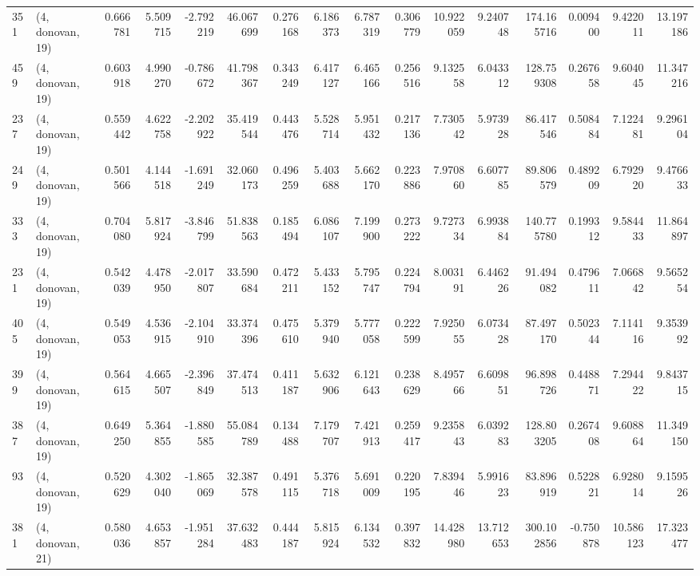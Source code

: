 \begin{tabular}{llrrrrrrrrrrrrrr}
351 &  (4, donovan, 19) &   0.666781 &   5.509715 &  -2.792219 &    46.067699 &   0.276168 &   6.186373 &   6.787319 &  0.306779 &  10.922059 &   9.240748 &   174.165716 &   0.009400 &   9.422011 &  13.197186 \\
459 &  (4, donovan, 19) &   0.603918 &   4.990270 &  -0.786672 &    41.798367 &   0.343249 &   6.417127 &   6.465166 &  0.256516 &   9.132558 &   6.043312 &   128.759308 &   0.267658 &   9.604045 &  11.347216 \\
237 &  (4, donovan, 19) &   0.559442 &   4.622758 &  -2.202922 &    35.419544 &   0.443476 &   5.528714 &   5.951432 &  0.217136 &   7.730542 &   5.973928 &    86.417546 &   0.508484 &   7.122481 &   9.296104 \\
249 &  (4, donovan, 19) &   0.501566 &   4.144518 &  -1.691249 &    32.060173 &   0.496259 &   5.403688 &   5.662170 &  0.223886 &   7.970860 &   6.607785 &    89.806579 &   0.489209 &   6.792920 &   9.476633 \\
333 &  (4, donovan, 19) &   0.704080 &   5.817924 &  -3.846799 &    51.838563 &   0.185494 &   6.086107 &   7.199900 &  0.273222 &   9.727334 &   6.993884 &   140.775780 &   0.199312 &   9.584433 &  11.864897 \\
231 &  (4, donovan, 19) &   0.542039 &   4.478950 &  -2.017807 &    33.590684 &   0.472211 &   5.433152 &   5.795747 &  0.224794 &   8.003191 &   6.446226 &    91.494082 &   0.479611 &   7.066842 &   9.565254 \\
405 &  (4, donovan, 19) &   0.549053 &   4.536915 &  -2.104910 &    33.374396 &   0.475610 &   5.379940 &   5.777058 &  0.222599 &   7.925055 &   6.073428 &    87.497170 &   0.502344 &   7.114116 &   9.353992 \\
399 &  (4, donovan, 19) &   0.564615 &   4.665507 &  -2.396849 &    37.474513 &   0.411187 &   5.632906 &   6.121643 &  0.238629 &   8.495766 &   6.609851 &    96.898726 &   0.448871 &   7.294422 &   9.843715 \\
387 &  (4, donovan, 19) &   0.649250 &   5.364855 &  -1.880585 &    55.084789 &   0.134488 &   7.179707 &   7.421913 &  0.259417 &   9.235843 &   6.039283 &   128.803205 &   0.267408 &   9.608864 &  11.349150 \\
93  &  (4, donovan, 19) &   0.520629 &   4.302040 &  -1.865069 &    32.387578 &   0.491115 &   5.376718 &   5.691009 &  0.220195 &   7.839446 &   5.991623 &    83.896919 &   0.522821 &   6.928014 &   9.159526 \\
381 &  (4, donovan, 21) &   0.580036 &   4.653857 &  -1.951284 &    37.632483 &   0.444187 &   5.815924 &   6.134532 &  0.397832 &  14.428980 &  13.712653 &   300.102856 &  -0.750878 &  10.586123 &  17.323477 \\

\end{tabular}
